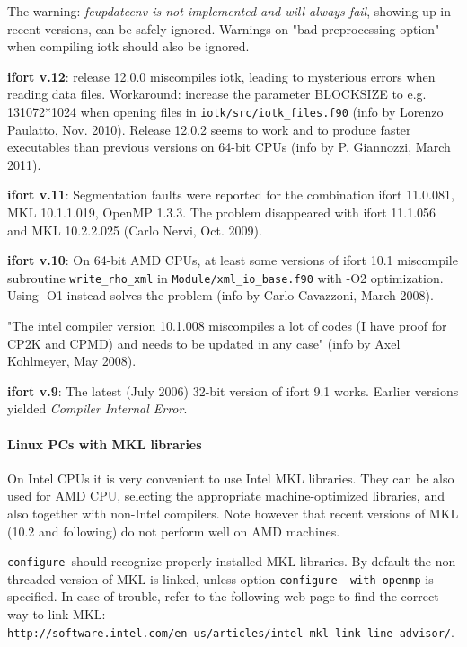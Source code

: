 \documentclass[12pt,a4paper]{article}
\def\configure{\texttt{configure}}
\begin{document}
The warning: {\em feupdateenv is not implemented and will always fail}, 
showing up in recent versions, can be safely ignored. Warnings on
"bad preprocessing option" when compiling iotk should also be ignored.

{\bf ifort v.12}: release 12.0.0 miscompiles iotk, leading to 
mysterious errors when reading data files. Workaround: increase 
the parameter BLOCKSIZE to e.g. 131072*1024 when opening files in 
\texttt{iotk/src/iotk\_files.f90} (info by Lorenzo Paulatto,
Nov. 2010). Release 12.0.2 seems to work and to produce faster executables
than previous versions on 64-bit CPUs (info by P. Giannozzi, March 2011).

{\bf ifort v.11}: Segmentation faults were reported for the combination 
ifort 11.0.081, MKL 10.1.1.019, OpenMP 1.3.3. The problem disappeared
with ifort 11.1.056 and MKL 10.2.2.025 (Carlo Nervi, Oct. 2009).

{\bf ifort v.10}: On 64-bit AMD CPUs, at least some versions of ifort 10.1 
miscompile subroutine \texttt{write\_rho\_xml} in 
\texttt{Module/xml\_io\_base.f90} with -O2
optimization. Using -O1 instead solves the problem (info by Carlo
Cavazzoni, March 2008). 

"The intel compiler version 10.1.008 miscompiles a lot of codes (I have proof 
for CP2K and CPMD) and needs to be updated in any case" (info by Axel
Kohlmeyer, May 2008).
 
{\bf ifort v.9}: The latest (July 2006) 32-bit version of ifort 9.1
works. Earlier versions yielded {\em Compiler Internal Error}.
    
\paragraph{Linux PCs with MKL libraries}
On Intel CPUs it is very convenient to use Intel MKL libraries. They can be
also used for AMD CPU, selecting the appropriate machine-optimized
libraries, and also together with non-Intel compilers. Note however
that recent versions of MKL (10.2 and following) do not perform
well on AMD machines.

\configure\ should recognize properly installed MKL libraries.
By default the non-threaded version of MKL is linked, unless option
\texttt{configure --with-openmp} is specified. In case of trouble,
refer to the following web page to find the correct way to link MKL:\\
\texttt{http://software.intel.com/en-us/articles/intel-mkl-link-line-advisor/}.
\end{document}
